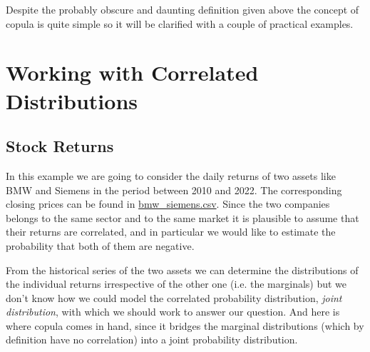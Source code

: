 

Despite the probably obscure and daunting definition given above the concept of copula is quite simple so it will be clarified with a couple of practical examples.

\section{Working with Correlated Distributions}
\label{sec:generate-correlated-distributions}

\subsection{Stock Returns}
\label{sec:correlated_stock_returns}

In this example we are going to consider the daily returns of two assets like BMW and Siemens in the period between 2010 and 2022. 
The corresponding closing prices can be found in \href{https://github.com/matteosan1/finance_course/raw/master/input_files/bmw_siemens.csv}{bmw\_siemens.csv}.
Since the two companies belongs to the same sector and to the same market it is plausible to assume that their returns are correlated, and in particular we would like to estimate the probability that both of them are negative.

From the historical series of the two assets we can determine the distributions of the individual returns irrespective of the other one (i.e. the marginals) but we don't know how we could model the correlated probability distribution, \emph{joint distribution}, with which we should work to answer our question. And here is where copula comes in hand, since it bridges the marginal distributions (which by definition have no correlation) into a joint probability distribution. 

